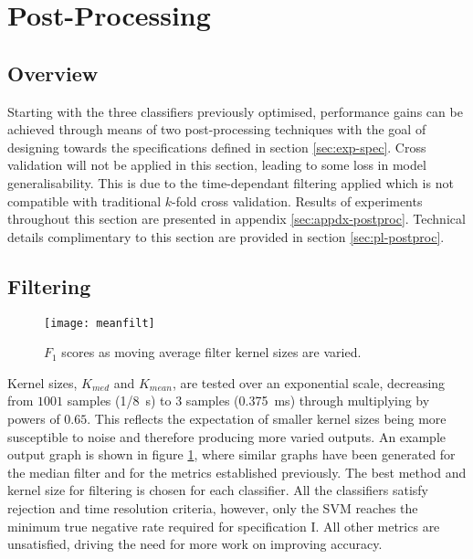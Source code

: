 \section{Post-Processing}
\label{sec:exp-postproc}
    \subsection{Overview}
    \label{subsec:exp-postproc-overview}
        Starting with the three classifiers previously optimised, performance gains can be achieved through means of two post-processing techniques with the goal of designing towards the specifications defined in section \ref{sec:exp-spec}. Cross validation will not be applied in this section, leading to some loss in model generalisability. This is due to the time-dependant filtering applied which is not compatible with traditional $k$-fold cross validation. Results of experiments throughout this section are presented in appendix \ref{sec:appdx-postproc}. Technical details complimentary to this section are provided in section \ref{sec:pl-postproc}.
    \subsection{Filtering}
    \label{subsec:exp-postproc-filt}
        \begin{figure}[ht]
            \centering
            \texttt{[image: meanfilt]}
            \caption{$F_{1}$ scores as moving average filter kernel sizes are varied.}
            \label{fig:exp-postproc-filt}
        \end{figure}
        Kernel sizes, $K_{med}$ and $K_{mean}$, are tested over an exponential scale, decreasing from $1001$ samples (\SI{1/8}{\second}) to $3$ samples (\SI{0.375}{\milli\second}) through multiplying by powers of $0.65$. This reflects the expectation of smaller kernel sizes being more susceptible to noise and therefore producing more varied outputs. An example output graph is shown in figure \ref{fig:exp-postproc-filt}, where similar graphs have been generated for the median filter and for the metrics established previously. The best method and kernel size for filtering is chosen for each classifier. All the classifiers satisfy rejection and time resolution criteria, however, only the SVM reaches the minimum true negative rate required for specification I. All other metrics are unsatisfied, driving the need for more work on improving accuracy.

